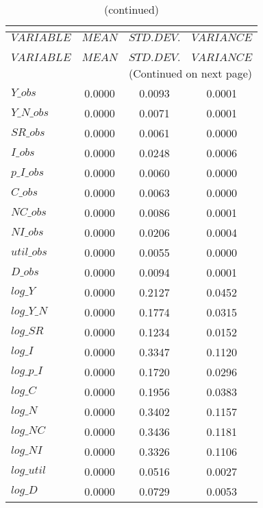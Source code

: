  
\begin{center}
\begin{longtable}{lccc} 
\caption{THEORETICAL MOMENTS}\\
 \label{Table:th_moments}\\
\toprule 
$VARIABLE   $	 & 	 $         MEAN$	 & 	 $    STD. DEV.$	 & 	 $     VARIANCE$\\
\midrule \endfirsthead 
\caption{(continued)}\\
 \toprule \\ 
$VARIABLE   $	 & 	 $         MEAN$	 & 	 $    STD. DEV.$	 & 	 $     VARIANCE$\\
\midrule \endhead 
\midrule \multicolumn{4}{r}{(Continued on next page)} \\ \bottomrule \endfoot 
\bottomrule \endlastfoot 
$Y\_obs     $	 & 	       0.0000	 & 	       0.0093	 & 	       0.0001 \\ 
$Y\_N\_obs  $	 & 	       0.0000	 & 	       0.0071	 & 	       0.0001 \\ 
$SR\_obs    $	 & 	       0.0000	 & 	       0.0061	 & 	       0.0000 \\ 
$I\_obs     $	 & 	       0.0000	 & 	       0.0248	 & 	       0.0006 \\ 
$p\_I\_obs  $	 & 	       0.0000	 & 	       0.0060	 & 	       0.0000 \\ 
$C\_obs     $	 & 	       0.0000	 & 	       0.0063	 & 	       0.0000 \\ 
$NC\_obs    $	 & 	       0.0000	 & 	       0.0086	 & 	       0.0001 \\ 
$NI\_obs    $	 & 	       0.0000	 & 	       0.0206	 & 	       0.0004 \\ 
$util\_obs  $	 & 	       0.0000	 & 	       0.0055	 & 	       0.0000 \\ 
$D\_obs     $	 & 	       0.0000	 & 	       0.0094	 & 	       0.0001 \\ 
$log\_Y     $	 & 	       0.0000	 & 	       0.2127	 & 	       0.0452 \\ 
$log\_Y\_N  $	 & 	       0.0000	 & 	       0.1774	 & 	       0.0315 \\ 
$log\_SR    $	 & 	       0.0000	 & 	       0.1234	 & 	       0.0152 \\ 
$log\_I     $	 & 	       0.0000	 & 	       0.3347	 & 	       0.1120 \\ 
$log\_p\_I  $	 & 	       0.0000	 & 	       0.1720	 & 	       0.0296 \\ 
$log\_C     $	 & 	       0.0000	 & 	       0.1956	 & 	       0.0383 \\ 
$log\_N     $	 & 	       0.0000	 & 	       0.3402	 & 	       0.1157 \\ 
$log\_NC    $	 & 	       0.0000	 & 	       0.3436	 & 	       0.1181 \\ 
$log\_NI    $	 & 	       0.0000	 & 	       0.3326	 & 	       0.1106 \\ 
$log\_util  $	 & 	       0.0000	 & 	       0.0516	 & 	       0.0027 \\ 
$log\_D     $	 & 	       0.0000	 & 	       0.0729	 & 	       0.0053 \\ 
\end{longtable}
 \end{center}
